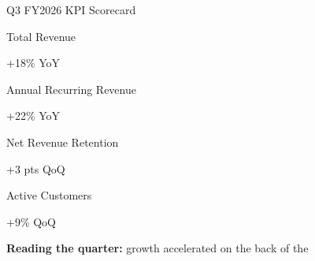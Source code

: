 \documentclass[xcolor=table]{beamer}
\begin{document}
\begin{frame}{Q3 FY2026 KPI Scorecard}
\begin{minipage}[t]{0.235\textwidth}
\begin{kpibox}
\centering{\color{corpteal}\Large\faChartLine}\par
{}\par
{\small Total Revenue}\par
{\scriptsize\color{corpteal!60!black} +18\% YoY}
\end{kpibox}
\end{minipage}\hfill
\begin{minipage}[t]{0.235\textwidth}
\begin{kpibox}
\centering{\color{corpteal}\Large\faRocket}\par
{}\par
{\small Annual Recurring Revenue}\par
{\scriptsize\color{corpteal!60!black} +22\% YoY}
\end{kpibox}
\end{minipage}\hfill
\begin{minipage}[t]{0.235\textwidth}
\begin{kpibox}
\centering{\color{corpteal}\Large\faHandshake}\par
{}\par
{\small Net Revenue Retention}\par
{\scriptsize\color{corpteal!60!black} +3 pts QoQ}
\end{kpibox}
\end{minipage}\hfill
\begin{minipage}[t]{0.235\textwidth}
\begin{kpibox}
\centering{\color{corpteal}\Large\faUsers}\par
{}\par
{\small Active Customers}\par
{\scriptsize\color{corpteal!60!black} +9\% QoQ}
\end{kpibox}
\end{minipage}
\par
\vspace{9pt}
\small\textbf{\color{corpnavy}Reading the quarter:} growth accelerated on the back of the

\end{frame}
\end{document}
